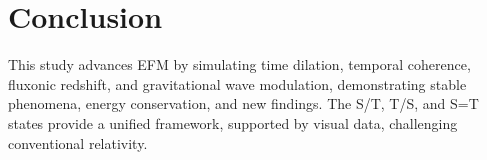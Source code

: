 \documentclass[11pt]{article}
\begin{document}
\section{Conclusion}
This study advances EFM by simulating time dilation, temporal coherence, fluxonic redshift, and gravitational wave modulation, demonstrating stable phenomena, energy conservation, and new findings. The S/T, T/S, and S=T states provide a unified framework, supported by visual data, challenging conventional relativity.



\end{document}

